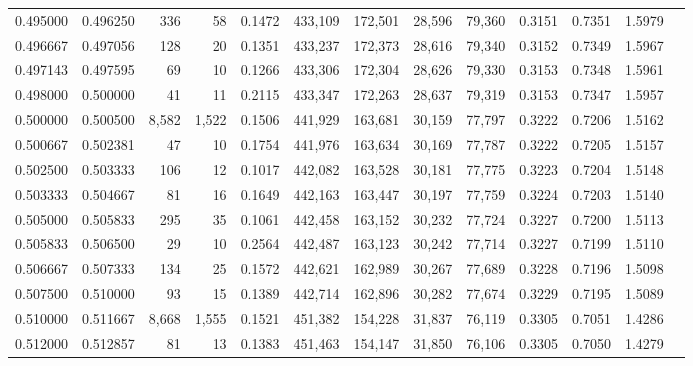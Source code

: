 \begin{tabular}{rrrrrrrrrrrrr}
0.495000 & 0.496250 &    336 &    58 &                                     0.1472 & 433,109 & 172,501 &  28,596 &  79,360 & 0.3151 & 0.7351 & 1.5979 \\
0.496667 & 0.497056 &    128 &    20 &                                     0.1351 & 433,237 & 172,373 &  28,616 &  79,340 & 0.3152 & 0.7349 & 1.5967 \\
0.497143 & 0.497595 &     69 &    10 &                                     0.1266 & 433,306 & 172,304 &  28,626 &  79,330 & 0.3153 & 0.7348 & 1.5961 \\
0.498000 & 0.500000 &     41 &    11 &                                     0.2115 & 433,347 & 172,263 &  28,637 &  79,319 & 0.3153 & 0.7347 & 1.5957 \\
0.500000 & 0.500500 &  8,582 & 1,522 &                                     0.1506 & 441,929 & 163,681 &  30,159 &  77,797 & 0.3222 & 0.7206 & 1.5162 \\
0.500667 & 0.502381 &     47 &    10 &                                     0.1754 & 441,976 & 163,634 &  30,169 &  77,787 & 0.3222 & 0.7205 & 1.5157 \\
0.502500 & 0.503333 &    106 &    12 &                                     0.1017 & 442,082 & 163,528 &  30,181 &  77,775 & 0.3223 & 0.7204 & 1.5148 \\
0.503333 & 0.504667 &     81 &    16 &                                     0.1649 & 442,163 & 163,447 &  30,197 &  77,759 & 0.3224 & 0.7203 & 1.5140 \\
0.505000 & 0.505833 &    295 &    35 &                                     0.1061 & 442,458 & 163,152 &  30,232 &  77,724 & 0.3227 & 0.7200 & 1.5113 \\
0.505833 & 0.506500 &     29 &    10 &                                     0.2564 & 442,487 & 163,123 &  30,242 &  77,714 & 0.3227 & 0.7199 & 1.5110 \\
0.506667 & 0.507333 &    134 &    25 &                                     0.1572 & 442,621 & 162,989 &  30,267 &  77,689 & 0.3228 & 0.7196 & 1.5098 \\
0.507500 & 0.510000 &     93 &    15 &                                     0.1389 & 442,714 & 162,896 &  30,282 &  77,674 & 0.3229 & 0.7195 & 1.5089 \\
0.510000 & 0.511667 &  8,668 & 1,555 &                                     0.1521 & 451,382 & 154,228 &  31,837 &  76,119 & 0.3305 & 0.7051 & 1.4286 \\
0.512000 & 0.512857 &     81 &    13 &                                     0.1383 & 451,463 & 154,147 &  31,850 &  76,106 & 0.3305 & 0.7050 & 1.4279 \\

\end{tabular}
